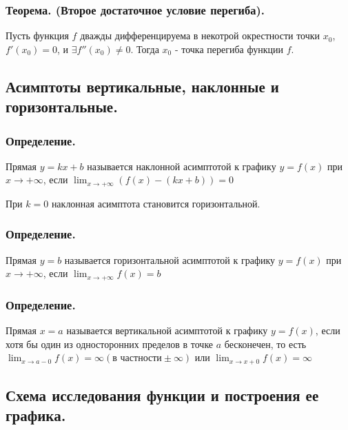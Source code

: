 \documentclass[a4paper,12pt]{article}
\theoremstyle{plain} %
\theoremstyle{definition} %
\theoremstyle{remark} %
\begin{document}
\subsubsection*{Теорема. (Второе достаточное условие перегиба).}
Пусть функция $f$ дважды дифференцируема в некотрой окрестности точки $x_0$, $f'(x_0) = 0$, и $\exists f''(x_0) \neq 0$. Тогда $x_0$ - точка перегиба функции $f$.

\newpage
\subsection*{Асимптоты вертикальные, наклонные и горизонтальные.                                                      }
\subsubsection*{Определение.}
Прямая $y = kx + b$ называется наклонной асимптотой к графику $y = f(x)$ при $x \rightarrow +\infty$, если $\lim_{x \rightarrow +\infty}(f(x) - (kx + b)) = 0$

При $k = 0$ наклонная асимптота становится горизонтальной.

\subsubsection*{Определение.}
Прямая $y = b$ называется горизонтальной асимптотой к графику $y = f(x)$ при $x \rightarrow +\infty$, если $\lim_{x \rightarrow +\infty} f(x) = b$

\subsubsection*{Определение.}
Прямая $x = a$ называется вертикальной асимптотой к графику $y = f(x)$, если хотя бы один из односторонних пределов в точке $a$ бесконечен, то есть $\lim_{x \rightarrow a - 0}f(x) = \infty (\text{в частности} \pm \infty)$ или $\lim_{x \rightarrow x + 0}f(x) = \infty$



\newpage
\subsection*{Схема исследования функции и построения ее графика.                                                      }
\end{document}
